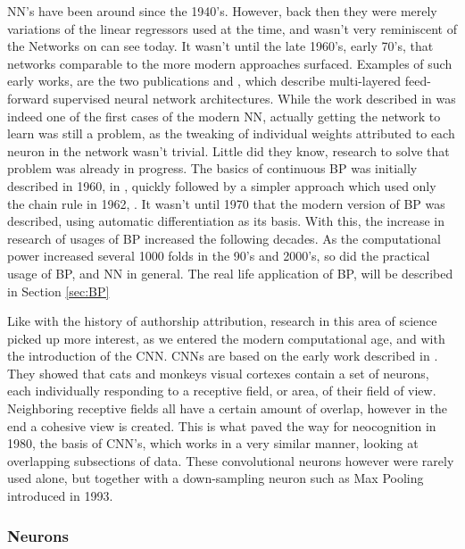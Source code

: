 \gls{NN}'s have been around since the 1940's. However, back then they
were merely variations of the linear regressors used at the time, and
wasn't very reminiscent of the Networks on can see today. It wasn't until
the late 1960's, early 70's, that networks comparable to the more modern
approaches surfaced. Examples of such early works, are the two publications
\cite{ivakhnenko1973cybernetic} and \cite{4308320}, which describe multi-layered
feed-forward supervised neural network architectures. While the work described
in \cite{4308320} was indeed one of the first cases of the modern \gls{NN},
actually getting the network to learn was still a problem, as the tweaking of
individual weights attributed to each neuron in the network wasn't trivial.
Little did they know, research to solve that problem was already in progress.
The basics of continuous \gls{BP} was initially described in 1960, in
\cite{Kelley1960}, quickly followed by a simpler approach which used only the
chain rule in 1962, \cite{DREYFUS196230}. It wasn't until 1970 that the modern
version of \gls{BP} was described, using automatic differentiation as its
basis. With this, the increase in research of usages of \gls{BP} increased the
following decades. As the computational power increased several 1000 folds in
the 90's and 2000's, so did the practical usage of \gls{BP}, and \gls{NN} in
general\cite{Schmidhuber:2015}. The real life application of \gls{BP}, will be
described in Section \ref{sec:BP}

Like with the history of authorship attribution, research in this area of
science picked up more interest, as we entered the modern computational age, and
with the introduction of the \gls{CNN}. \gls{CNN}s are based on the early work
described in \cite{TJP:TJP19681951215}. They showed that cats and monkeys visual
cortexes contain a set of neurons, each individually responding to a receptive
field, or area, of their field of view. Neighboring receptive fields all have a
certain amount of overlap, however in the end a cohesive view is created. This
is what paved the way for neocognition in 1980\cite{Fukushima1980}, the basis
of \gls{CNN}'s, which works in a very similar manner, looking at overlapping
subsections of data. These convolutional neurons however were rarely used alone,
but together with a down-sampling neuron such as Max Pooling introduced in
1993.\cite{Schmidhuber:2015}


\subsubsection{Neurons}\label{sec:neurons}

